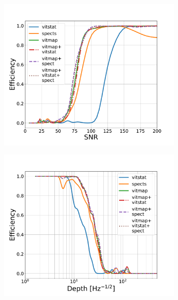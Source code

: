 \begin{figure}
	\begin{subfigure}[h]{0.5\textwidth}
		\includegraphics[width=\columnwidth]{C4_cnn/o2_snr_eff.pdf}
		\caption{}
		\label{machine:results:snr_o2}
	\end{subfigure}
	\begin{subfigure}[h]{0.5\textwidth}
		\includegraphics[width=\columnwidth]{C4_cnn/o2_depth_eff.pdf}
		\caption{}
		\label{machine:results:depth_o2}
	\end{subfigure}


\end{figure}
